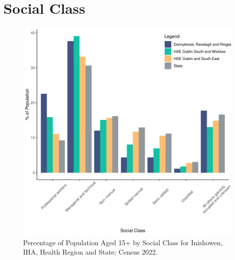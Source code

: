 \documentclass{article}
\begin{document}
\section{Social Class}\label{sect:SC}
\begin{figure}[H]
	\centering
	\includegraphics[width = 140mm]{../figures/SocialClassED.pdf}
	\caption{Percentage of Population Aged 15+ by Social Class for Inishowen, IHA, Health Region and State; Census 2022.}
	\label{fig:vbnv}
	\end{figure}
\end{document}
